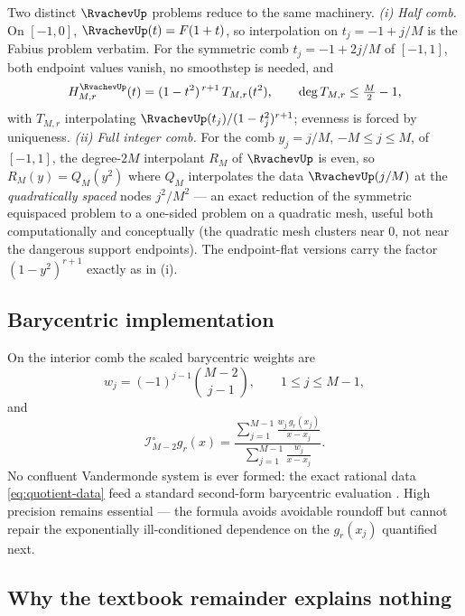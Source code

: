 \documentclass[11pt,oneside]{article}
\numberwithin{equation}{section}
\theoremstyle{definition}
\theoremstyle{remark}
\newcommand{\Lag}{\mathcal I}
\begin{document}
\begin{remark}
\label{rem:up-versions}
Two distinct $\RvachevUp$ problems reduce to the same machinery.
\emph{(i) Half comb.}  On $[-1,0]$, $\RvachevUp(t)=F(1+t)$, so
interpolation on $t_j=-1+j/M$ is the Fabius problem verbatim.  For
the symmetric comb $t_j=-1+2j/M$ of $[-1,1]$, both endpoint values
vanish, no smoothstep is needed, and
\begin{equation}
 H^{\RvachevUp}_{M,r}(t)=(1-t^{2})^{\,r+1}\,T_{M,r}(t^{2}),
 \qquad
 \deg T_{M,r}\le \tfrac M2-1,
 \label{eq:up-factor}
\end{equation}
with $T_{M,r}$ interpolating
$\RvachevUp(t_j)/(1-t_j^{2})^{r+1}$; evenness is forced by uniqueness.
\emph{(ii) Full integer comb.}  For the comb $y_j=j/M$,
$-M\le j\le M$, of $[-1,1]$, the degree-$2M$ interpolant $R_M$ of
$\RvachevUp$ is even, so $R_M(y)=Q_M(y^{2})$ where $Q_M$ interpolates the
data $\RvachevUp(j/M)$ at the \emph{quadratically spaced} nodes
$j^{2}/M^{2}$ --- an exact reduction of the symmetric equispaced
problem to a one-sided problem on a quadratic mesh, useful both
computationally and conceptually (the quadratic mesh clusters near
$0$, not near the dangerous support endpoints).  The endpoint-flat
versions carry the factor $(1-y^{2})^{r+1}$ exactly as in (i).
\end{remark}

\subsection{Barycentric implementation}

On the interior comb the scaled barycentric weights are
\begin{equation}
 w_j=(-1)^{j-1}\binom{M-2}{j-1},
 \qquad 1\le j\le M-1,
 \label{eq:interior-weights}
\end{equation}
and
\begin{equation}
 \Lag^{\circ}_{M-2}g_r(x)
 =\frac{\displaystyle\sum_{j=1}^{M-1}\frac{w_j\,g_r(x_j)}{x-x_j}}
 {\displaystyle\sum_{j=1}^{M-1}\frac{w_j}{x-x_j}}.
 \label{eq:bary-interior}
\end{equation}
No confluent Vandermonde system is ever formed: the exact rational
data \eqref{eq:quotient-data} feed a standard second-form barycentric
evaluation \cite{BerrutTrefethen2004}.  High precision remains
essential --- the formula avoids avoidable roundoff but cannot repair
the exponentially ill-conditioned dependence on the $g_r(x_j)$
quantified next.

\subsection{Why the textbook remainder explains nothing}
\end{document}
